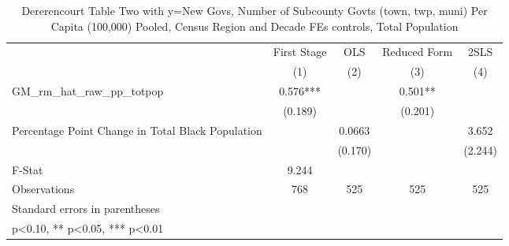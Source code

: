 \begin{table}[htbp]\centering
\def\sym#1{\ifmmode^{#1}\else\(^{#1}\)\fi}
\caption{Dererencourt Table Two with y=New Govs, Number of Subcounty Govts (town, twp, muni) Per Capita (100,000) Pooled, Census Region and Decade FEs controls, Total Population}
\begin{tabular}{l*{4}{c}}
\toprule
                    & First Stage   &         OLS   &Reduced Form   &        2SLS   \\
                    &\multicolumn{1}{c}{(1)}   &\multicolumn{1}{c}{(2)}   &\multicolumn{1}{c}{(3)}   &\multicolumn{1}{c}{(4)}   \\
\midrule
GM\_rm\_hat\_raw\_pp\_totpop&       0.576***&               &       0.501** &               \\
                    &     (0.189)   &               &     (0.201)   &               \\
\addlinespace
Percentage Point Change in Total Black Population&               &      0.0663   &               &       3.652   \\
                    &               &     (0.170)   &               &     (2.244)   \\
\midrule
F-Stat              &       9.244   &               &               &               \\
Observations        &         768   &         525   &         525   &         525   \\
\bottomrule
\multicolumn{5}{l}{\footnotesize Standard errors in parentheses}\\
\multicolumn{5}{l}{\footnotesize * p<0.10, ** p<0.05, *** p<0.01}\\
\end{tabular}
\end{table}
